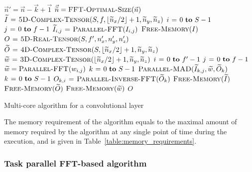 \documentclass[conference]{./IEEEtran/IEEEtran}
\DeclarePairedDelimiter{\floor}{\lfloor}{\rfloor}
\begin{document}
  \begin{algorithm}
    {\footnotesize
      \begin{codebox}
        \li $\vec{n}' = \vec{n} - \vec{k} + \vec{1}$
        \li $\vec{\widetilde{n}} = \textnormal{\scshape FFT-Optimal-Size}(\vec{n})$
        \li $\widetilde{I} \gets \proc{5D-Complex-Tensor}(S,f,\floor{\widetilde{n}_x/2}+1,\widetilde{n}_y,\widetilde{n}_z)$
        \li \For $i \gets 0 \To S-1$
        \li   \Do \For $j \gets 0 \To f-1$
        \li     \Do $\widetilde{I}_{i,j} \mathrel{\hspace{1pt}=\hspace{1pt}} \textnormal{\scshape Parallel-FFT}(I_{i,j})$
        \End \End
        \li $\textnormal{\scshape Free-Memory}(I)$
        \li $O \mathrel{\hspace{1pt}=\hspace{1pt}} \textnormal{\scshape5D-Real-Tensor}(S,f',n'_x,n'_y,n'_z)$
        \li $\widetilde{O} \gets \proc{4D-Complex-Tensor}(S,\floor{\widetilde{n}_x/2}+1,\widetilde{n}_y,\widetilde{n}_z)$
        \li $\widetilde{w} \gets \proc{3D-Complex-Tensor}(\floor{\widetilde{n}_x/2}+1,\widetilde{n}_y,\widetilde{n}_z)$
        \li \For $i \gets 0 \To f'-1$
        \li   \Do \For $j \gets 0 \To f-1$
        \li     \Do $\widetilde{w} = \textnormal{\scshape Parallel-FFT}(w_{i,j})$
        \li         \For $k \gets 0 \To S-1$
        \li           \Do $\textnormal{\scshape Parallel-MAD}(\widetilde{I}_{k,j}, \widetilde{w}, \widetilde{O}_{k})$
        \End \End
        \li   \For $k \gets 0 \To S-1$
        \li      \Do $O_{k,i} \mathrel{\hspace{1pt}=\hspace{1pt}} \textnormal{\scshape Parallel-Inverse-FFT}(\widetilde{O}_{k})$
        \End \End
        \li $\textnormal{\scshape Free-Memory}(\widetilde{I})$
        \li $\textnormal{\scshape Free-Memory}(\widetilde{O})$
        \li $\textnormal{\scshape Free-Memory}(\widetilde{w})$
        \li \Return $O$
      \end{codebox}
    }

    \caption{Multi-core algorithm for a convolutional layer}
    \label{alg:cpu_fft_alg1}
  \end{algorithm}

  The memory requirement of the algorithm equals to the maximal amount
  of memory required by the algorithm at any single point of time
  during the execution, and is given in
  Table~\ref{table:memory_requirements}.

\subsubsection{Task parallel FFT-based algorithm}
\end{document}
